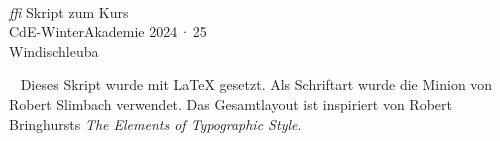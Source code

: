 \begin{titlepage}
  \centering\large
  ~
  \vfill  
  \textcolor{Maroon}{} \\ \medskip
  \vfill
  {\fontsize{180}{60}\selectfont \textcolor{black!20}{\emph{ffi}}}
  \vfill
  Skript zum Kurs\\
  CdE-WinterAkademie 2024\,·\,25\\
  Windischleuba
  \vfill
\end{titlepage}

\thispagestyle{empty}%
~%
\vfill%
\noindent Dieses Skript wurde mit \LaTeX{} gesetzt. Als Schriftart wurde die
\mbox{Minion} von Robert Slimbach verwendet. Das Gesamtlayout ist \mbox{inspiriert} von Robert
Bringhursts \emph{The Elements of Typographic Style}.
\cleardoublepage

